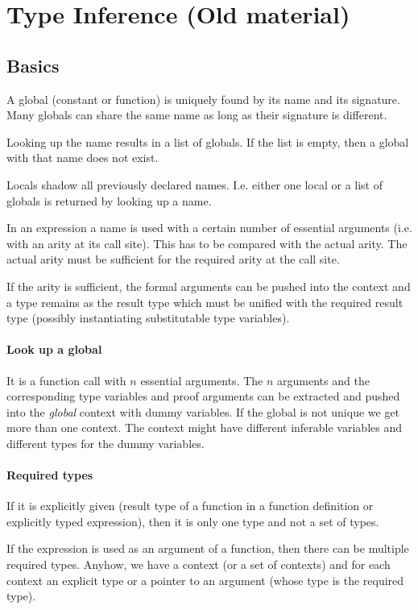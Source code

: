 \newpage
\section{Type Inference (Old material)}

\subsection{Basics}

A global (constant or function) is uniquely found by its name and its
signature. Many globals can share the same name as long as their signature is
different.

Looking up the name results in a list of globals. If the list is empty, then a
global with that name does not exist.

Locals shadow all previously declared names. I.e. either one local or a list
of globals is returned by looking up a name.

In an expression a name is used with a certain number of essential arguments
(i.e. with an arity at its call site). This has to be compared with the actual
arity. The actual arity must be sufficient for the required arity at the call
site.

If the arity is sufficient, the formal arguments can be pushed into the
context and a type remains as the result type which must be unified with the
required result type (possibly instantiating substitutable type variables).


\paragraph{Look up a global} It is a function call with $n$ essential
arguments. The $n$ arguments and the corresponding type variables and proof
arguments can be extracted and pushed into the \emph{global} context with
dummy variables. If the global is not unique we get more than one context. The
context might have different inferable variables and different types for the
dummy variables.

\paragraph{Required types}
If it is explicitly given (result type of a function in a function definition
or explicitly typed expression), then it is only one type and not a set of
types.

If the expression is used as an argument of a function, then there can be
multiple required types. Anyhow, we have a context (or a set of contexts) and
for each context an explicit type or a pointer to an argument (whose type is
the required type).




